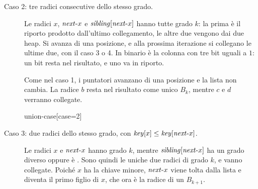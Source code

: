 \begin{description}
  \item[{Caso 2: tre radici consecutive dello stesso grado.}] Le radici $x$, $\mathit{next}\text{-}x$ e $\mathit{sibling}[\mathit{next}\text{-}x]$ hanno tutte grado $k$: la prima è il riporto prodotto dall'ultimo collegamento, le altre due vengono dai due heap. Si avanza di una posizione, e alla prossima iterazione si collegano le ultime due, con il caso 3 o 4. In binario è la colonna con tre bit uguali a $1$: un bit resta nel risultato, e uno va in riporto.

  \begin{casofig}[2]
  Come nel caso 1, i puntatori avanzano di una posizione e la lista non cambia. La radice $b$ resta nel risultato come unico $B_k$, mentre $c$ e $d$ verranno collegate.
  \tcblower
  \begin{widget}{union-case}[case=2]
  \end{widget}
  \end{casofig}

  \item[{Caso 3: due radici dello stesso grado, con $\mathit{key}[x] \le \mathit{key}[\mathit{next}\text{-}x]$.}] Le radici $x$ e $\mathit{next}\text{-}x$ hanno grado $k$, mentre $\mathit{sibling}[\mathit{next}\text{-}x]$ ha un grado diverso oppure è \Nil{}. Sono quindi le uniche due radici di grado $k$, e vanno collegate. Poiché $x$ ha la chiave minore, $\mathit{next}\text{-}x$ viene tolta dalla lista e diventa il primo figlio di $x$, che ora è la radice di un $B_{k+1}$.


\end{description}
